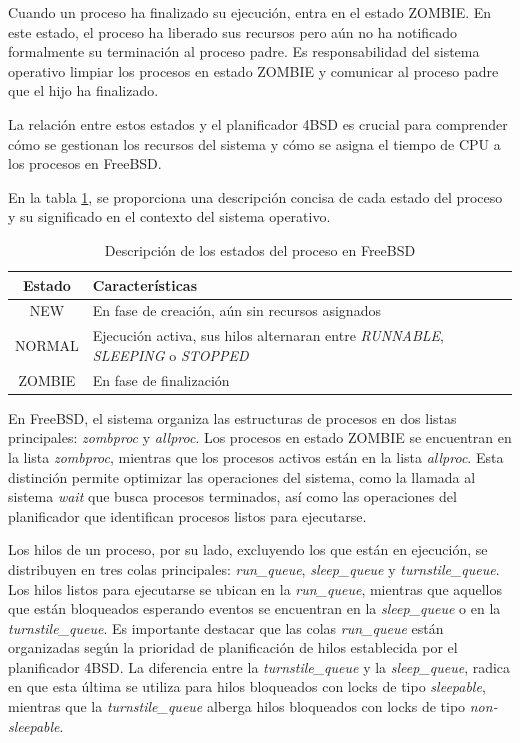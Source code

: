 Cuando un proceso ha finalizado su ejecución, entra en el estado ZOMBIE. En este estado, el proceso ha liberado sus recursos pero aún no ha notificado formalmente su terminación al proceso padre. Es responsabilidad del sistema operativo limpiar los procesos en estado ZOMBIE y comunicar al proceso padre que el hijo ha finalizado.

La relación entre estos estados y el planificador 4BSD es crucial para comprender cómo se gestionan los recursos del sistema y cómo se asigna el tiempo de CPU a los procesos en FreeBSD.

En la tabla \ref{tabla:estados-proceso}, se proporciona una descripción concisa de cada estado del proceso y su significado en el contexto del sistema operativo.

\begin{table}[H]
    \centering
    \begin{tabular}{|c|p{}|}
        \hline
        \textbf{Estado} & \textbf{Características}                                                                             \\
        \hline
        NEW             & En fase de creación, aún sin recursos asignados                                                      \\
        \hline
        NORMAL          & Ejecución activa, sus hilos alternaran entre \textit{RUNNABLE}, \textit{SLEEPING} o \textit{STOPPED} \\
        \hline
        ZOMBIE          & En fase de finalización                                                                              \\
        \hline
    \end{tabular}
    \caption{Descripción de los estados del proceso en FreeBSD}
    \label{tabla:estados-proceso}
\end{table}

En FreeBSD, el sistema organiza las estructuras de procesos en dos listas principales: \textit{zombproc} y \textit{allproc}. Los procesos en estado ZOMBIE se encuentran en la lista \textit{zombproc}, mientras que los procesos activos están en la lista \textit{allproc}. Esta distinción permite optimizar las operaciones del sistema, como la llamada al sistema \textit{wait} que busca procesos terminados, así como las operaciones del planificador que identifican procesos listos para ejecutarse.

Los hilos de un proceso, por su lado, excluyendo los que están en ejecución, se distribuyen en tres colas principales: \textit{run\_queue}, \textit{sleep\_queue} y \textit{turnstile\_queue}. Los hilos listos para ejecutarse se ubican en la \textit{run\_queue}, mientras que aquellos que están bloqueados esperando eventos se encuentran en la \textit{sleep\_queue} o en la \textit{turnstile\_queue}. Es importante destacar que las colas \textit{run\_queue} están organizadas según la prioridad de planificación de hilos establecida por el planificador 4BSD. La diferencia entre la \textit{turnstile\_queue} y la \textit{sleep\_queue}, radica en que esta última se utiliza para hilos bloqueados con locks de tipo \textit{sleepable}, mientras que la \textit{turnstile\_queue} alberga hilos bloqueados con locks de tipo \textit{non-sleepable}.


